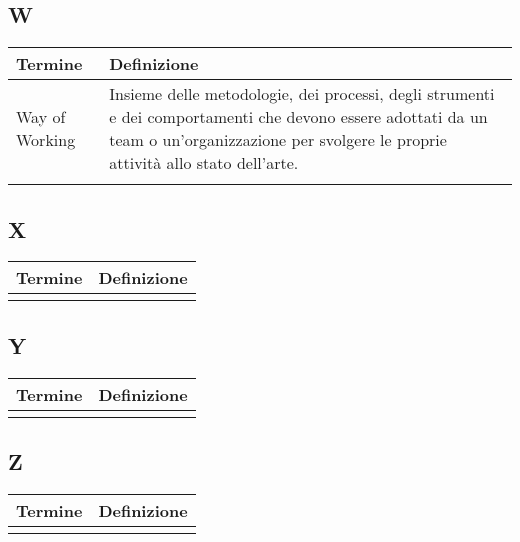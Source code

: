 \documentclass[10pt]{article}
\begin{document}
\subsection{W} %
\begin{tabularx}{\textwidth}{|>{\centering\arraybackslash}l|X|}
\hline
\rowcolor[gray]{0.8}
\textbf{Termine} & \textbf{Definizione}\\
\hline
Way of Working & Insieme delle metodologie, dei processi, degli strumenti e dei comportamenti che devono essere adottati da un team o un'organizzazione per svolgere le proprie attività allo stato dell'arte.\\
\hline
 & \\
\hline
\end{tabularx}

\subsection{X} %
\begin{tabularx}{\textwidth}{|>{\centering\arraybackslash}l|X|}
\hline
\rowcolor[gray]{0.8}
\textbf{Termine} & \textbf{Definizione}\\
\hline
 & \\
\hline
\end{tabularx}

\subsection{Y} %
\begin{tabularx}{\textwidth}{|>{\centering\arraybackslash}l|X|}
\hline
\rowcolor[gray]{0.8}
\textbf{Termine} & \textbf{Definizione}\\
\hline
 & \\
\hline
\end{tabularx}

\subsection{Z} %
\begin{tabularx}{\textwidth}{|>{\centering\arraybackslash}l|X|}
\hline
\rowcolor[gray]{0.8}
\textbf{Termine} & \textbf{Definizione}\\
\hline
 & \\
\hline
\end{tabularx}
\end{document}
